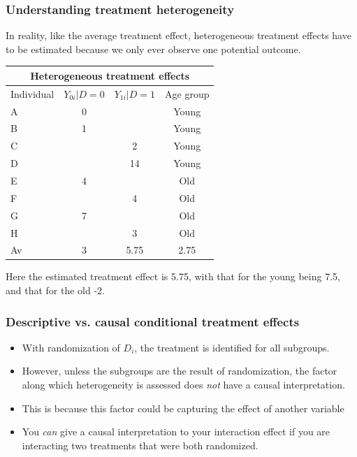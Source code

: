 \documentclass[12pt,english,dvipsnames,aspectratio=169,handout]{beamer}\usepackage[]{graphicx}\usepackage[]{xcolor}
\begin{document}
\begin{frame}
  \frametitle{Understanding treatment heterogeneity}
\footnotesize
In reality, like the average treatment effect, heterogeneous treatment effects have to be estimated because we only ever observe one potential outcome.

\tiny
\begin{table}\centering
\begin{tabular}{lccc}
\toprule
\multicolumn{4}{c}{Heterogeneous treatment effects}   \\
\midrule
Individual & $Y_{0i}|D=0$ &  $Y_{1i}|D=1$   & Age group   \\
\midrule
A          &   0    &                & Young        \\
B          &   1    &                & Young        \\
C          &        &    2           & Young        \\
D          &        &    14          & Young        \\
E          &   4    &                & Old        \\
F          &        &    4           & Old        \\
G          &   7    &                & Old        \\
H          &        &    3           & Old        \\
\hline\hline
Av         &   3    &    5.75     &   2.75         \\
\bottomrule
\end{tabular}
\end{table}

\footnotesize
Here the estimated treatment effect is 5.75, with that for the young being 7.5, and that for the old -2.

\end{frame}




\begin{frame}
  \frametitle{Descriptive vs. causal conditional treatment effects}
\footnotesize

\begin{itemize}
  \item With randomization of $D_i$, the treatment is identified for all subgroups.
  \item However, unless the subgroups are the result of randomization, the factor along which heterogeneity is assessed does \emph{not} have a causal interpretation.
  \item This is because this factor could be capturing the effect of another variable
  \item You \emph{can} give a causal interpretation to your interaction effect if you are interacting two treatments that were both randomized. 
\end{itemize}
\vspace{1cm}

\end{frame}
\end{document}
